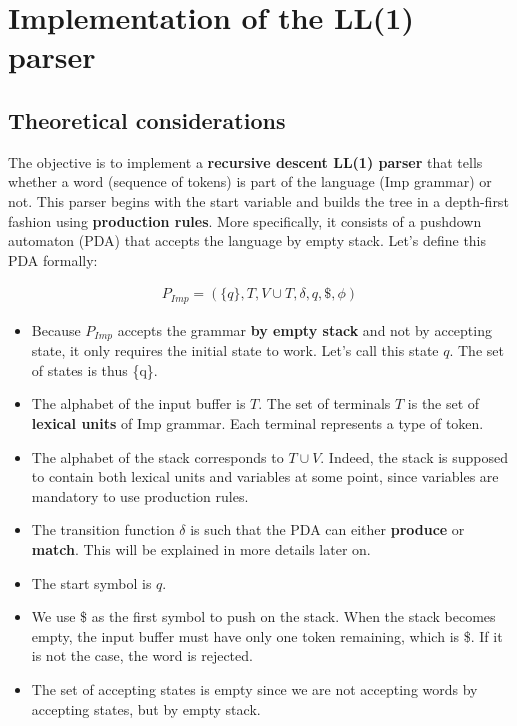 \section{Implementation of the LL(1) parser}

\subsection{Theoretical considerations}

The objective is to implement a \textbf{recursive descent LL(1) parser} that tells whether a word (sequence of tokens)
is part of the language (Imp grammar) or not. This parser begins with the start variable and builds the
tree in a depth-first fashion using \textbf{production rules}. More specifically, it consists of a pushdown
automaton (PDA) that accepts the language by empty stack. Let's define this PDA formally:

\begin{equation}
  \begin{split}
    P_{Imp} = (\{q\}, T, V \cup T, \delta, q, \$, \phi)
   \end{split}
\end{equation}

\begin{itemize}
  \item Because $P_{Imp}$ accepts the grammar \textbf{by empty stack} and not by accepting state, it only requires the initial state to work. 
        Let's call this state $q$. The set of states is thus \{q\}.
  \item The alphabet of the input buffer is $T$. The set of terminals $T$ is the set of \textbf{lexical units} of Imp grammar. 
        Each terminal represents a type of token.
  \item The alphabet of the stack corresponds to $T \cup V$. Indeed, the stack is supposed to contain both lexical units and variables
        at some point, since variables are mandatory to use production rules.
  \item The transition function $\delta$ is such that the PDA can either \textbf{produce} or \textbf{match}. This will be explained
        in more details later on.
  \item The start symbol is $q$.
  \item We use \$ as the first symbol to push on the stack. When the stack becomes empty, the input buffer must have only one token
        remaining, which is \$. If it is not the case, the word is rejected.
  \item The set of accepting states is empty since we are not accepting words by accepting states, but by empty stack.
\end{itemize}

